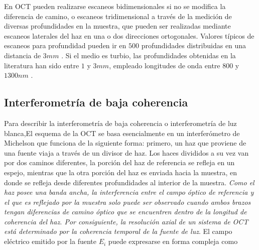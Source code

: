 En OCT pueden realizarse escaneos bidimensionales si no se modifica la diferencia de camino, o escaneos tridimensional a través de la medición de diversas profundidades en la muestra, que pueden ser realizadas mediante escaneos laterales del haz en una o dos direcciones ortogonales. Valores típicos de escaneos para profundidad pueden ir en $500$ profundidades distribuidas en una distancia de $3mm$ \cite{Tomlins}. Si el medio es turbio, las profundidades obtenidas en la literatura han sido entre $1$ y $3mm$, empleado longitudes de onda entre $800$ y $1300nm$ \cite{Drexler2015}.


\subsection{Interferometría de baja coherencia}

Para describir la interferometría de baja coherencia o interferometría de luz blanca,El esquema de la OCT se basa esencialmente en un interferómetro de Michelson que funciona de la siguiente forma: primero, un haz que proviene de una fuente viaja a través de un divisor de haz. Los haces divididos a su vez van por dos caminos diferentes, la porción del haz de referencia se refleja en un espejo, mientras que la otra porción del haz es enviada hacia la muestra, en donde se refleja desde diferentes profundidades al interior de la muestra. \emph{Como el haz posee una banda ancha, la interferencia entre el campo óptico de referencia y el que es reflejado por la muestra solo puede ser observado cuando ambos brazos tengan diferencias de camino óptico que se encuentren dentro de la longitud de coherencia del haz. Por consiguiente, la resolución axial de un sistema de OCT está determinado por la coherencia temporal de la fuente de luz}. El campo eléctrico emitido por la fuente $E_i$ puede expresarse en forma compleja como

